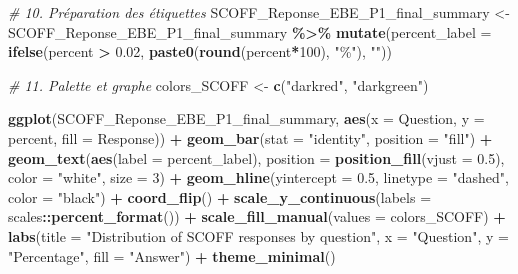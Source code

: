 \documentclass[
]{article}
\newenvironment{Shaded}{\begin{snugshade}}{\end{snugshade}}
\newcommand{\AttributeTok}[1]{\textcolor[rgb]{0.13,0.29,0.53}{#1}}
\newcommand{\CommentTok}[1]{\textcolor[rgb]{0.56,0.35,0.01}{\textit{#1}}}
\newcommand{\DecValTok}[1]{\textcolor[rgb]{0.00,0.00,0.81}{#1}}
\newcommand{\FloatTok}[1]{\textcolor[rgb]{0.00,0.00,0.81}{#1}}
\newcommand{\FunctionTok}[1]{\textcolor[rgb]{0.13,0.29,0.53}{\textbf{#1}}}
\newcommand{\NormalTok}[1]{#1}
\newcommand{\OtherTok}[1]{\textcolor[rgb]{0.56,0.35,0.01}{#1}}
\newcommand{\SpecialCharTok}[1]{\textcolor[rgb]{0.81,0.36,0.00}{\textbf{#1}}}
\newcommand{\StringTok}[1]{\textcolor[rgb]{0.31,0.60,0.02}{#1}}
\begin{document}
\begin{Shaded}
\begin{Highlighting}[]
\CommentTok{\# 10. Préparation des étiquettes}
\NormalTok{SCOFF\_Reponse\_EBE\_P1\_final\_summary }\OtherTok{\textless{}{-}}\NormalTok{ SCOFF\_Reponse\_EBE\_P1\_final\_summary }\SpecialCharTok{\%\textgreater{}\%}
  \FunctionTok{mutate}\NormalTok{(}\AttributeTok{percent\_label =} \FunctionTok{ifelse}\NormalTok{(percent }\SpecialCharTok{\textgreater{}} \FloatTok{0.02}\NormalTok{, }\FunctionTok{paste0}\NormalTok{(}\FunctionTok{round}\NormalTok{(percent}\SpecialCharTok{*}\DecValTok{100}\NormalTok{), }\StringTok{"\%"}\NormalTok{), }\StringTok{""}\NormalTok{))}

\CommentTok{\# 11. Palette et graphe}
\NormalTok{colors\_SCOFF }\OtherTok{\textless{}{-}} \FunctionTok{c}\NormalTok{(}\StringTok{"darkred"}\NormalTok{, }\StringTok{"darkgreen"}\NormalTok{)}

\FunctionTok{ggplot}\NormalTok{(SCOFF\_Reponse\_EBE\_P1\_final\_summary, }\FunctionTok{aes}\NormalTok{(}\AttributeTok{x =}\NormalTok{ Question, }\AttributeTok{y =}\NormalTok{ percent, }\AttributeTok{fill =}\NormalTok{ Response)) }\SpecialCharTok{+}
  \FunctionTok{geom\_bar}\NormalTok{(}\AttributeTok{stat =} \StringTok{"identity"}\NormalTok{, }\AttributeTok{position =} \StringTok{"fill"}\NormalTok{) }\SpecialCharTok{+}
  \FunctionTok{geom\_text}\NormalTok{(}\FunctionTok{aes}\NormalTok{(}\AttributeTok{label =}\NormalTok{ percent\_label),}
            \AttributeTok{position =} \FunctionTok{position\_fill}\NormalTok{(}\AttributeTok{vjust =} \FloatTok{0.5}\NormalTok{),}
            \AttributeTok{color =} \StringTok{"white"}\NormalTok{,}
            \AttributeTok{size =} \DecValTok{3}\NormalTok{) }\SpecialCharTok{+}
  \FunctionTok{geom\_hline}\NormalTok{(}\AttributeTok{yintercept =} \FloatTok{0.5}\NormalTok{, }\AttributeTok{linetype =} \StringTok{"dashed"}\NormalTok{, }\AttributeTok{color =} \StringTok{"black"}\NormalTok{) }\SpecialCharTok{+}
  \FunctionTok{coord\_flip}\NormalTok{() }\SpecialCharTok{+}
  \FunctionTok{scale\_y\_continuous}\NormalTok{(}\AttributeTok{labels =}\NormalTok{ scales}\SpecialCharTok{::}\FunctionTok{percent\_format}\NormalTok{()) }\SpecialCharTok{+}
  \FunctionTok{scale\_fill\_manual}\NormalTok{(}\AttributeTok{values =}\NormalTok{ colors\_SCOFF) }\SpecialCharTok{+}
  \FunctionTok{labs}\NormalTok{(}\AttributeTok{title =} \StringTok{"Distribution of SCOFF responses by question"}\NormalTok{,}
       \AttributeTok{x =} \StringTok{"Question"}\NormalTok{,}
       \AttributeTok{y =} \StringTok{"Percentage"}\NormalTok{,}
       \AttributeTok{fill =} \StringTok{"Answer"}\NormalTok{) }\SpecialCharTok{+}
  \FunctionTok{theme\_minimal}\NormalTok{()}
\end{Highlighting}
\end{Shaded}
\end{document}
